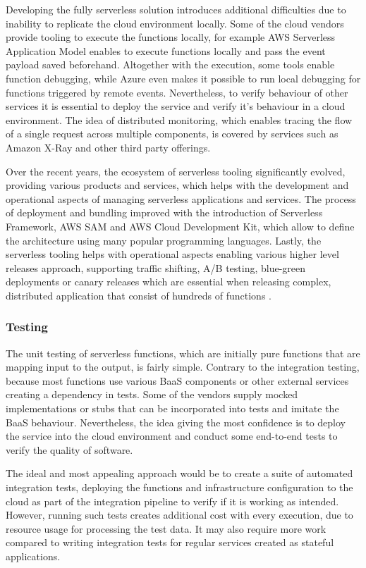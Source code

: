 Developing the fully serverless solution introduces additional difficulties due to inability to replicate the cloud environment locally. Some of the cloud vendors provide tooling to execute the functions locally, for example AWS Serverless Application Model enables to execute functions locally and pass the event payload saved beforehand. Altogether with the execution, some tools enable function debugging, while Azure even makes it possible to run local debugging for functions triggered by remote events. Nevertheless, to verify behaviour of other services it is essential to deploy the service and verify it's behaviour in a cloud environment. The idea of distributed monitoring, which enables tracing the flow of a single request across multiple components, is covered by services such as Amazon X-Ray and other third party offerings.

Over the recent years, the ecosystem of serverless tooling significantly evolved, providing various products and services, which helps with the development and operational aspects of managing serverless applications and services. The process of deployment and bundling improved with the introduction of Serverless Framework, AWS SAM and AWS Cloud Development Kit, which allow to define the architecture using many popular programming languages. Lastly, the serverless tooling helps with operational aspects enabling various higher level releases approach, supporting traffic shifting, A/B testing, blue-green deployments or canary releases which are essential when releasing complex, distributed application that consist of hundreds of functions \cite{MartinFowlerServerless}.

\subsubsection*{Testing}

The unit testing of serverless functions, which are initially pure functions that are mapping input to the output, is fairly simple. Contrary to the integration testing, because most functions use various BaaS components or other external services creating a dependency in tests. Some of the vendors supply mocked implementations or stubs that can be  incorporated into tests and imitate the BaaS behaviour. Nevertheless, the idea giving the most confidence is to deploy the service into the cloud environment and conduct some end-to-end tests to verify the quality of software.

The ideal and most appealing approach would be to create a suite of automated integration tests, deploying the functions and infrastructure configuration to the cloud as part of the integration pipeline to verify if it is working as intended. However, running such tests creates additional cost with every execution, due to resource usage for processing the test data. It may also require more work compared to writing integration tests for regular services created as stateful applications. 

